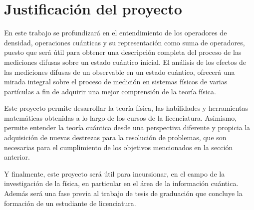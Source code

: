 \chapter*{Justificación del proyecto}




En este trabajo se profundizará en el entendimiento de los operadores de
densidad, operaciones cuánticas y su representación como suma de operadores,
puesto que será útil para obtener una descripción completa del proceso de las
mediciones difusas sobre un estado cuántico inicial. El análisis de los efectos
de las mediciones difusas de un observable en un estado cuántico, ofrecerá una
mirada integral sobre el proceso de medición en sistemas físicos de varias
partículas a fin de adquirir una mejor comprensión de la teoría física.

Este proyecto permite desarrollar la teoría física, las habilidades y
herramientas matemáticas obtenidas a lo largo de los cursos de la licenciatura.
Asimismo, permite entender la teoría cuántica desde una perspectiva diferente y
propicia la adquisición de nuevas destrezas para la resolución de problemas,
que son necesarias para el cumplimiento de los objetivos mencionados en la
sección anterior.



 
 Y finalmente, este proyecto será útil para incursionar, en el campo de la
investigación de la física, en particular en el área de la información
cuántica. Además será una fase previa al trabajo de tesis de graduación que
concluye la formación de un estudiante de licenciatura.    


